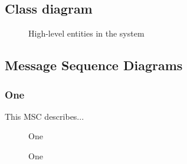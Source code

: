 \subsection{Class diagram}
	\begin{figure}[H]
		\centering
		\caption{High-level entities in the system}
		\label{fig:analysis-model}
	\end{figure}

\subsection{Message Sequence Diagrams}
	\subsubsection{One}
		This MSC describes...
		\begin{figure}[H]
			\centering
			\begin{msc}{One}
			
			\end{msc}
			\caption{One}
			\label{msc:one}
		\end{figure}